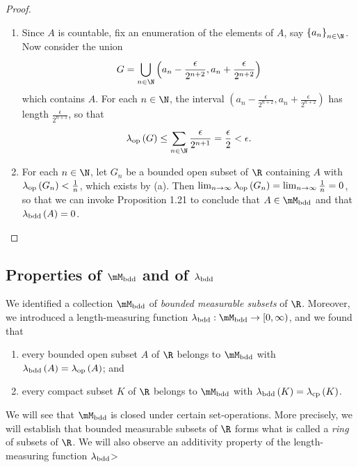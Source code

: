 \documentclass[pmath450]{subfiles}
\begin{document}
    \begin{proof}
        \begin{enumerate}
            \item Since $A$ is countable, fix an enumeration of the elements of $A$, say $\left\lbrace a_n \right\rbrace^{}_{n\in\N}$. Now consider the union
                \begin{equation*}
                    G = \bigcup^{}_{n\in\N} \left( a_n-\frac{\epsilon}{2^{n+2}}, a_n+\frac{\epsilon}{2^{n+2}} \right)
                \end{equation*}
                which contains $A$. For each $n\in\N$, the interval $\left( a_n-\frac{\epsilon}{2^{n+2}}, a_n+\frac{\epsilon}{2^{n+2}} \right)$ has length $\frac{\epsilon}{2^{n+1}}$, so that
                \begin{equation*}
                    \lambda_{\op}\left( G \right) \leq \sum^{}_{n\in\N} \frac{\epsilon}{2^{n+1}} = \frac{\epsilon}{2} < \epsilon.
                \end{equation*}

            \item For each $n\in\N$, let $G_n$ be a bounded open subset of $\R$ containing $A$ with $\lambda_{\operatorname{op}}\left( G_n \right)<\frac{1}{n}$, which exists by (a). Then $\lim_{n\to\infty}\lambda_{\operatorname{op}}\left( G_n \right) = \lim_{n\to\infty} \frac{1}{n} = 0$, so that we can invoke Proposition 1.21 to conclude that $A\in\mM_{\bdd}$ and that $\lambda_{\operatorname{bdd}}\left( A \right)=0$.
        \end{enumerate}
    \end{proof}

    \subsection{Properties of $\mM_{\bdd}$ and of $\lambda_{\operatorname{bdd}}$}
    
    We identified a collection $\mM_{\bdd}$ of \textit{bounded measurable subsets} of $\R$. Moreover, we introduced a length-measuring function $\lambda_{\bdd}:\mM_{\bdd}\to\left[ 0,\infty \right)$, and we found that
    \begin{enumerate}
        \item every bounded open subset $A$ of $\R$ belongs to $\mM_{\bdd}$ with $\lambda_{\operatorname{bdd}}\left( A \right) = \lambda_{\operatorname{op}}\left( A \right)$; and
        \item every compact subset $K$ of $\R$ belongs to $\mM_{\bdd}$ with $\lambda_{\operatorname{bdd}}\left( K \right) = \lambda_{\operatorname{cp}}\left( K \right)$.
    \end{enumerate}
    We will see that $\mM_{\bdd}$ is closed under certain set-operations. More precisely, we will establish that bounded measurable subsets of $\R$ forms what is called a \textit{ring} of subsets of $\R$. We will also observe an additivity property of the length-measuring function $\lambda_{\operatorname{bdd}}$>
\end{document}
